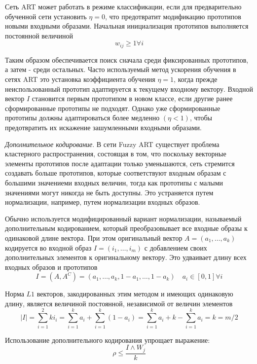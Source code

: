 Сеть  ART  может  работать  в  режиме  классификации,  если  для  предварительно  обученной сети установить $\eta = 0$, что предотвратит модификацию  прототипов  новыми  входными  образами. Начальная инициализация прототипов  выполняется постоянной величиной
$$
	w_{ij} \geq 1 \forall i
$$

Таким  образом  обеспечивается  поиск  сначала среди фиксированных прототипов, а затем - среди остальных. Часто используемый метод ускорения обучения  в  сетях  ART  это  установка  коэффициента обучения $\eta = 1$, когда прежде неиспользованный прототип адаптируется к текущему входному вектору. Входной вектор $I$ становится первым прототипом в новом классе, если другие ранее сформированные прототипы не подходят. Однако уже сформированные  прототипы  должны  адаптироваться  более  медленно  $(\eta  <  1)$,  чтобы  предотвратить их искажение зашумленными входными образами.

\textit{Дополнительное кодирование}. В сети Fuzzy ART существует  проблема  кластерного  распространения,  состоящая  в  том,  что  поскольку  векторные
элементы  прототипов  после  адаптации  только уменьшаются,  сеть  стремится  создавать  больше прототипов,  которые  соответствуют  входным  образам с большими значениеми входных величин, тогда как прототипы с малыми значениями могут 
никогда не быть доступны. Это устраняется путем нормализации,  например,  путем  нормализации входных образов.

Обычно  используется  модифицированный  вариант  нормализации,  называемый  дополнительным кодированием, который преобразовывает все входные образы к одинаковой длине вектора. При этом оригинальный вектор  $A=(a_1, \dots ,a_k  )$ кодируется во входной образ  $I=(i_1, \ldots, i_m)$ с добавлением своих дополнительных элементов к оригинальному вектору. Это удваивает длину всех входных образов и прототипов
$$
	I = (A,A^C) = (a_1, \ldots, a_k, 1-a_1, \ldots, 1-a_k) \quad a_i \in [0,1] \forall i
$$

Норма $L1$ векторов, закодированных этим методом  и  имеющих  одинаковую  длину,  является величиной постоянной, независимой от  величин элементов
$$
	|I| = \sum_{i=1}^2k i_i = \sum_{i=1}^k a_i + \sum_{i=1}^k (1 - a_i) = \sum_{i=1}^k a_i + k - \sum_{i=1}^k a_i = k = m / 2 
$$

Использование  дополнительного  кодирования упрощает выражение:
$$
	\rho \leq \frac{I \wedge W_j}{k}
$$


